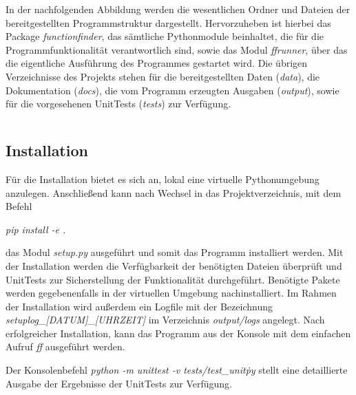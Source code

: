 In der nachfolgenden Abbildung werden die wesentlichen Ordner und Dateien der bereitgestellten Programmstruktur dargestellt. Hervorzuheben ist hierbei das Package \emph{functionfinder}, das sämtliche Pythonmodule beinhaltet, die für die Programmfunktionalität verantwortlich sind, sowie das Modul \emph{ffrunner}, über das die eigentliche Ausführung des Programmes gestartet wird.
Die übrigen Verzeichnisse des Projekts stehen für die bereitgestellten Daten (\emph{data}), die Dokumentation (\emph{docs}), die vom Programm erzeugten Ausgaben (\emph{output}), sowie für die vorgesehenen UnitTests (\emph{tests}) zur Verfügung.

	
\begin{tabular}{c}  %

\end{tabular}

\subsection{Installation}

Für die Installation bietet es sich an, lokal eine virtuelle Pythonumgebung anzulegen. Anschließend kann nach Wechsel in das Projektverzeichnis, mit dem Befehl
\begin{center}\emph{pip install -e .}\end{center}
das Modul \emph{setup.py} ausgeführt und somit das Programm installiert werden.
Mit der Installation werden die Verfügbarkeit der benötigten Dateien überprüft und UnitTests zur Sicherstellung der Funktionalität durchgeführt. Benötigte Pakete werden gegebenenfalls in der virtuellen Umgebung nachinstalliert. Im Rahmen der Installation wird außerdem ein Logfile mit der Bezeichnung \emph{setuplog\_[DATUM]\_[UHRZEIT]} im Verzeichnis \emph{output/logs} angelegt.
Nach erfolgreicher Installation, kann das Programm aus der Konsole mit dem einfachen Aufruf \emph{ff} ausgeführt werden.

Der Konsolenbefehl \emph{python -m unittest -v tests/test\_unit\.py} stellt eine detaillierte Ausgabe der Ergebnisse der UnitTests zur Verfügung. 

